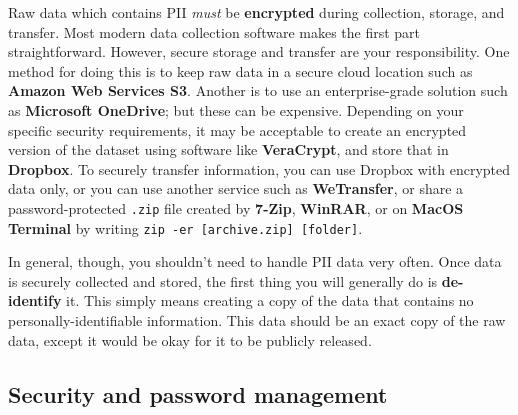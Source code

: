 Raw data which contains PII \textit{must} be \textbf{encrypted}
during collection, storage, and transfer.
Most modern data collection software makes the first part straightforward.
However, secure storage and transfer are your responsibility.
One method for doing this is to keep raw data in a secure cloud location such as \textbf{Amazon Web Services S3}.
Another is to use an enterprise-grade solution such as \textbf{Microsoft OneDrive}; but these can be expensive.
Depending on your specific security requirements,
it may be acceptable to create an encrypted version of the dataset
using software like \textbf{VeraCrypt}, and store that in \textbf{Dropbox}.
To securely transfer information,
you can use Dropbox with encrypted data only,
or you can use another service such as \textbf{WeTransfer},
or share a password-protected \texttt{.zip} file created by \textbf{7-Zip},
\textbf{WinRAR},
or on \textbf{MacOS Terminal} by writing \texttt{zip -er [archive.zip] [folder]}.

In general, though, you shouldn't need to handle PII data very often.
Once data is securely collected and stored, the first thing you will generally do is \textbf{de-identify} it.
This simply means creating a copy of the data that contains no personally-identifiable information.
This data should be an exact copy of the raw data,
except it would be okay for it to be publicly released.\cite{matthews2011data}

\subsection{Security and password management}

